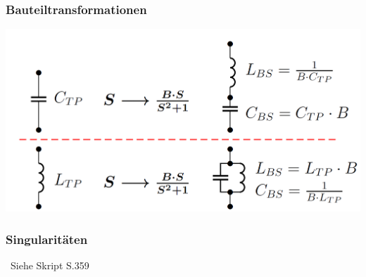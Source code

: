 \begin{minipage}[t]{0.48\columnwidth}
    \subsubsection{Bauteiltransformationen}
    \includegraphics[width=\columnwidth]{images/bauteiltransformation_TP_BS.png}
\end{minipage}
\hfill
\begin{minipage}[t]{0.48\columnwidth}
    \subsubsection{Singularitäten}

    \textrightarrow\ Siehe Skript S.359
\end{minipage}
